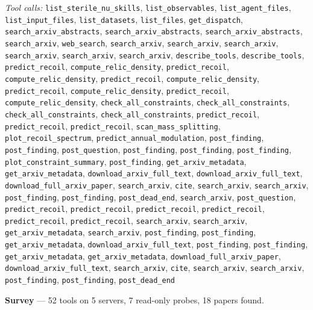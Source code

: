 \documentclass[11pt,a4paper]{article}
\begin{document}
\textit{Tool calls:} \texttt{list\_sterile\_nu\_skills}, \texttt{list\_observables}, \texttt{list\_agent\_files}, \texttt{list\_input\_files}, \texttt{list\_datasets}, \texttt{list\_files}, \texttt{get\_dispatch}, \texttt{search\_arxiv\_abstracts}, \texttt{search\_arxiv\_abstracts}, \texttt{search\_arxiv\_abstracts}, \texttt{search\_arxiv}, \texttt{web\_search}, \texttt{search\_arxiv}, \texttt{search\_arxiv}, \texttt{search\_arxiv}, \texttt{search\_arxiv}, \texttt{search\_arxiv}, \texttt{search\_arxiv}, \texttt{describe\_tools}, \texttt{describe\_tools}, \texttt{predict\_recoil}, \texttt{compute\_relic\_density}, \texttt{predict\_recoil}, \texttt{compute\_relic\_density}, \texttt{predict\_recoil}, \texttt{compute\_relic\_density}, \texttt{predict\_recoil}, \texttt{compute\_relic\_density}, \texttt{predict\_recoil}, \texttt{compute\_relic\_density}, \texttt{check\_all\_constraints}, \texttt{check\_all\_constraints}, \texttt{check\_all\_constraints}, \texttt{check\_all\_constraints}, \texttt{predict\_recoil}, \texttt{predict\_recoil}, \texttt{predict\_recoil}, \texttt{scan\_mass\_splitting}, \texttt{plot\_recoil\_spectrum}, \texttt{predict\_annual\_modulation}, \texttt{post\_finding}, \texttt{post\_finding}, \texttt{post\_question}, \texttt{post\_finding}, \texttt{post\_finding}, \texttt{post\_finding}, \texttt{plot\_constraint\_summary}, \texttt{post\_finding}, \texttt{get\_arxiv\_metadata}, \texttt{get\_arxiv\_metadata}, \texttt{download\_arxiv\_full\_text}, \texttt{download\_arxiv\_full\_text}, \texttt{download\_full\_arxiv\_paper}, \texttt{search\_arxiv}, \texttt{cite}, \texttt{search\_arxiv}, \texttt{search\_arxiv}, \texttt{post\_finding}, \texttt{post\_finding}, \texttt{post\_dead\_end}, \texttt{search\_arxiv}, \texttt{post\_question}, \texttt{predict\_recoil}, \texttt{predict\_recoil}, \texttt{predict\_recoil}, \texttt{predict\_recoil}, \texttt{predict\_recoil}, \texttt{predict\_recoil}, \texttt{search\_arxiv}, \texttt{search\_arxiv}, \texttt{get\_arxiv\_metadata}, \texttt{search\_arxiv}, \texttt{post\_finding}, \texttt{post\_finding}, \texttt{get\_arxiv\_metadata}, \texttt{download\_arxiv\_full\_text}, \texttt{post\_finding}, \texttt{post\_finding}, \texttt{get\_arxiv\_metadata}, \texttt{get\_arxiv\_metadata}, \texttt{download\_full\_arxiv\_paper}, \texttt{download\_arxiv\_full\_text}, \texttt{search\_arxiv}, \texttt{cite}, \texttt{search\_arxiv}, \texttt{search\_arxiv}, \texttt{post\_finding}, \texttt{post\_finding}, \texttt{post\_dead\_end}\par
\textbf{Survey} --- 52 tools on 5 servers, 7 read-only probes, 18 papers found.
\end{document}
